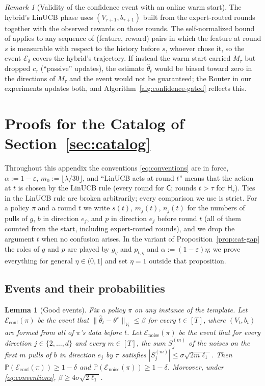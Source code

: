 \documentclass{article}
\newtheorem{lemma}{Lemma}
\theoremstyle{definition}
\theoremstyle{remark}
\newtheorem{remark}{Remark}
\newcommand{\Prb}{\mathbb{P}}
\newcommand{\eps}{\varepsilon}
\theoremstyle{remark}
\newcommand{\Cold}{\mathsf{C}}
\newcommand{\Hyb}{\mathsf{H}}
\begin{document}
\begin{remark}[Validity of the confidence event with an online warm start]
The hybrid's LinUCB phase uses $(V_{\tau+1},b_{\tau+1})$ built from the
expert-routed rounds together with the observed rewards on those rounds. The
self-normalized bound of \cite{abbasi2011improved} applies to any sequence of
(feature, reward) pairs in which the feature at round $s$ is measurable with
respect to the history before $s$, whoever chose it, so the event
$\mathcal E_\delta$ covers the hybrid's trajectory. If instead the warm start
carried $M_\tau$ but dropped $c_\tau$ (``passive'' updates), the estimate
$\widehat\theta_t$ would be biased toward zero in the directions of $M_\tau$
and the event would not be guaranteed; the Router in our experiments updates
both, and Algorithm~\ref{alg:confidence-gated} reflects this.
\end{remark}

\section{Proofs for the Catalog of Section~\ref{sec:catalog}}
\label{app:catalog}

Throughout this appendix the conventions \eqref{eq:conventions} are in force,
$\alpha:=1-\eps$, $m_0:=\lfloor\lambda/30\rfloor$, and ``LinUCB acts at round
$t$'' means that the action at $t$ is chosen by the LinUCB rule (every round
for $\Cold$; rounds $t>\tau$ for $\Hyb_\tau$). Ties in the LinUCB rule are
broken arbitrarily; every comparison we use is strict. For a policy $\pi$ and
a round $t$ we write $s(t)$, $m_j(t)$, $n_j(t)$ for the numbers of pulls of
$g$, $b$ in direction $e_j$, and $p$ in direction $e_j$ before round $t$
(all of them counted from the start, including expert-routed rounds), and we
drop the argument $t$ when no confusion arises. In the variant of
Proposition~\ref{prop:cat-gap} the roles of $g$ and $p$ are played by
$g_\eta$ and $p_{t,\eta}$ and $\alpha:=(1-\eps)\eta$; we prove everything for
general $\eta\in(0,1]$ and set $\eta=1$ outside that proposition.

\subsection{Events and their probabilities}

\begin{lemma}[Good events]
\label{lem:cat-events}
Fix a policy $\pi$ on any instance of the template. Let
$\mathcal E_{\mathrm{conf}}(\pi)$ be the event that
$\|\widehat\theta_t-\theta^\star\|_{V_t}\le\beta$ for every $t\in[T]$, where
$(V_t,b_t)$ are formed from all of $\pi$'s data before $t$. Let
$\mathcal E_{\mathrm{noise}}(\pi)$ be the event that for every direction
$j\in\{2,\dots,d\}$ and every $m\in[T]$, the sum $S_j^{(m)}$ of the noises on
the first $m$ pulls of $b$ in direction $e_j$ by $\pi$ satisfies
$|S_j^{(m)}|\le\sigma\sqrt{2m\ell_1}$. Then
$\Prb(\mathcal E_{\mathrm{conf}}(\pi))\ge1-\delta$ and
$\Prb(\mathcal E_{\mathrm{noise}}(\pi))\ge1-\delta$. Moreover, under
\eqref{eq:conventions}, $\beta\ge4\sigma\sqrt{2\ell_1}$.
\end{lemma}
\end{document}
